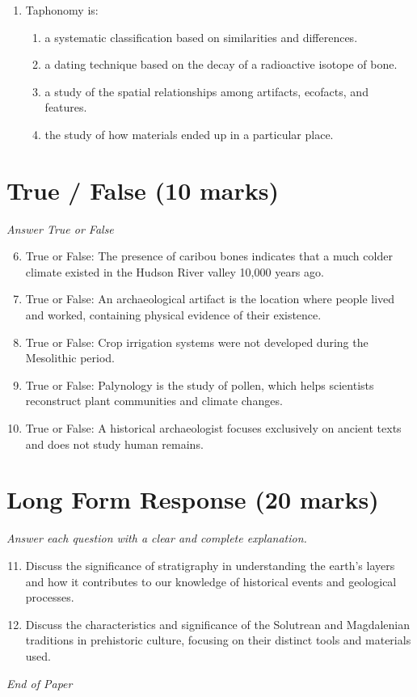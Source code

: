 \documentclass[12pt]{article}
\begin{document}
\begin{enumerate}[label=\arabic*.]
\begin{enumerate}[label=(\alph*)]
    \item The position of the foramen magnum
    \item The absence of a divergent big toe
    \item All the above
\end{enumerate}
\item Taphonomy is:
\begin{enumerate}[label=(\alph*)]
    \item a systematic classification based on similarities and differences.
    \item a dating technique based on the decay of a radioactive isotope of bone.
    \item a study of the spatial relationships among artifacts, ecofacts, and features.
    \item the study of how materials ended up in a particular place.
\end{enumerate}
\end{enumerate}

\section*{True / False (10 marks)}
\textit{Answer True or False}
\begin{enumerate}[label=\arabic*.]
\setcounter{enumi}{5}
\item True or False: The presence of caribou bones indicates that a much colder climate existed in the Hudson River valley 10,000 years ago.
\item True or False: An archaeological artifact is the location where people lived and worked, containing physical evidence of their existence.
\item True or False: Crop irrigation systems were not developed during the Mesolithic period.
\item True or False: Palynology is the study of pollen, which helps scientists reconstruct plant communities and climate changes.
\item True or False: A historical archaeologist focuses exclusively on ancient texts and does not study human remains.
\end{enumerate}

\section*{Long Form Response (20 marks)}
\textit{Answer each question with a clear and complete explanation.}
\begin{enumerate}[label=\arabic*.]
\setcounter{enumi}{10}
\item Discuss the significance of stratigraphy in understanding the earth's layers and how it contributes to our knowledge of historical events and geological processes.
\item Discuss the characteristics and significance of the Solutrean and Magdalenian traditions in prehistoric culture, focusing on their distinct tools and materials used.
\end{enumerate}

\vfill
\noindent\textit{End of Paper}
\end{document}
